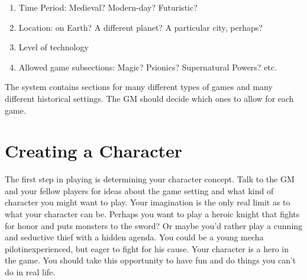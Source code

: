 \documentclass[twoside]{book}
\begin{document}
\begin{enumerate}
      
  \item   
                
    {  
     Time Period: Medieval? Modern-day? Futuristic?
                 
    }
  
            
  \item   
                
    {  
      Location: on Earth? A different planet? A
                 particular city, perhaps? 
    }
  
            
  \item   
              
    {  
      Level of technology 
    }
    
            
  \item   
                
    {  
      Allowed game subsections: Magic? Psionics?
                 Supernatural Powers? etc. 
    }
  
            
\end{enumerate}
  
    {  
     The \APATHY{}  system contains sections for many
            different types of games and many different historical
            settings. The GM should decide which ones to allow for each
            game.
          
    }
  
    

\section{Creating a Character}
    
    {  
     The first step in playing \APATHY{}  is determining
            your character concept. Talk to the GM and your fellow
            players for ideas about the game setting and what kind of
            character you might want to play. Your imagination is the
            only real limit as to what your character can be. Perhaps you
            want to play a heroic knight that fights for honor and puts
            monsters to the sword? Or maybe you'd rather play a
            cunning and seductive thief with a hidden agenda. You could
            be a young mecha pilotinexperienced, but eager to
            fight for his cause. Your character is a hero in the game.
            You should take this opportunity to have fun and do things
            you can't do in real life.
          
    }
  
\end{document}
